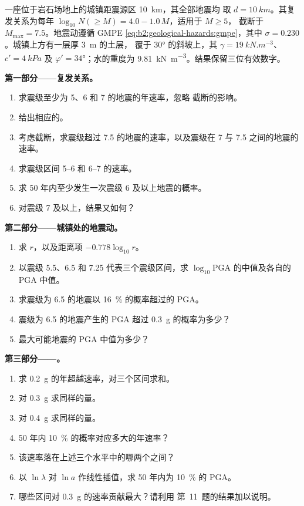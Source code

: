 \begin{problem}\label{pb:b2:geological-hazards:1}
一座位于岩石场地上的城镇距震源区 \qty{10}{km}，其全部地震均
取 $d = \qty{10}{km}$。其复发关系为每年 $\log_{10} N(\geq M) = 4.0 - 1.0\,M$，适用于 $M \geq 5$，
截断于 $M_{\max} = 7.5$。地震动遵循 GMPE \eqref{eq:b2:geological-hazards:gmpe}，其中
$\sigma = 0.230$。城镇上方有一层厚 \qty{3}{m} 的土层，
覆于 \ang{30} 的斜坡上，其 $\gamma = \qty{19}{kN.m^{-3}}$、$c' = \qty{4}{kPa}$ 及 $\varphi' = \ang{34}$；水的重度为
\qty{9.81}{kN.m^{-3}}。结果保留三位有效数字。

\noindent\textbf{第一部分——复发关系。}
\begin{enumerate}
  \item 求震级至少为 5、6 和 7 的地震的年速率，忽略
        截断的影响。
  \item 给出相应的。
  \item 考虑截断，求震级超过 7.5 的地震的速率，以及震级在 7
        与 7.5 之间的地震的速率。
  \item 求震级区间 5--6 和 6--7 的速率。
  \item 求 50 年内至少发生一次震级 6 及以上地震的概率。
  \item 对震级 7 及以上，结果又如何？
\end{enumerate}

\noindent\textbf{第二部分——城镇处的地震动。}
\begin{enumerate}[resume]
  \item 求 $r$，以及距离项 $-0.778\log_{10} r$。
  \item 以震级 5.5、6.5 和 7.25 代表三个震级区间，求
        $\log_{10}\mathrm{PGA}$ 的中值及各自的 PGA 中值。
  \item 求震级为 6.5 的地震以 \qty{16}{\percent} 的概率超过的 PGA。
  \item 震级为 6.5 的地震产生的 PGA 超过 \qty{0.3}{g} 的概率为多少？
  \item 最大可能地震的 PGA 中值为多少？
\end{enumerate}

\noindent\textbf{第三部分——。}
\begin{enumerate}[resume]
  \item 求 \qty{0.2}{g} 的年超越速率，对三个区间求和。
  \item 对 \qty{0.3}{g} 求同样的量。
  \item 对 \qty{0.4}{g} 求同样的量。
  \item 50 年内 \qty{10}{\percent} 的概率对应多大的年速率？
  \item 该速率落在上述三个水平中的哪两个之间？
  \item 以 $\ln\lambda$ 对 $\ln a$ 作线性插值，求
        50 年内为 \qty{10}{\percent} 的 PGA。
  \item 哪些区间对 \qty{0.3}{g} 的速率贡献最大？请利用
        第~11~题的结果加以说明。
\end{enumerate}


\end{problem}
